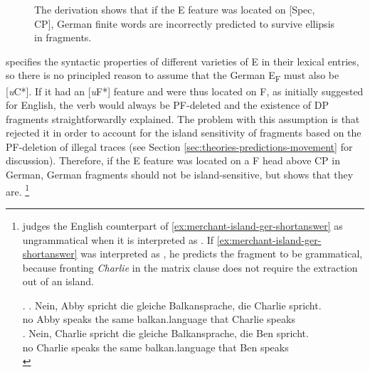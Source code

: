 \begin{figure}[t]

\caption{The derivation shows that if the E feature was located on [Spec, CP], German finite words are incorrectly predicted to survive ellipsis in fragments.\label{fig:merchant-spec-cp}}
\end{figure}
%
\citet{merchant2004} specifies the syntactic properties of different varieties of E in their lexical entries, so there is no principled reason to assume that the German E\textsubscript{F} must also be [\textit{u}C*]. If it had an [\textit{u}F*] feature and were thus located on F, as \citet{merchant2004} initially suggested for English, the verb would always be PF-deleted and the existence of DP fragments straightforwardly explained. The problem with this assumption is that \citet{merchant2004} rejected it in order to account for the island sensitivity of fragments based on the PF-deletion of illegal traces (see Section \ref{sec:theories-predictions-movement} for discussion). Therefore, if the E feature was located on a F head above CP in German, German fragments should not be island-sensitive, but \Next shows that they are.%
%
{\footnote{\citet{merchant2004} judges the English counterpart of \ref{ex:merchant-island-ger-shortanswer} as ungrammatical when it is interpreted as \Next[a]. If \ref{ex:merchant-island-ger-shortanswer} was interpreted as \Next[b], he predicts the fragment to be grammatical, because fronting \textit{Charlie} in the matrix clause does not require the extraction out of an island.

\ex. \ag. Nein, Abby spricht die gleiche Balkansprache, die Charlie spricht.\\
	 no Abby speaks the same balkan.language that Charlie speaks\\
     \bg. Nein, Charlie spricht die gleiche Balkansprache, die Ben spricht.\\
     	 no Charlie speaks the same balkan.language that Ben speaks\\
       
}}
\afterfn%
%

